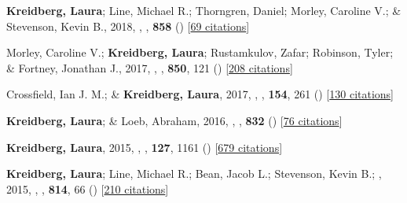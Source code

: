 \item[{\color{numcolor}\scriptsize10}] \textbf{Kreidberg, Laura}; Line, Michael R.; Thorngren, Daniel; Morley, Caroline V.; \& Stevenson, Kevin B., 2018, , \apj, \textbf{858} () [\href{https://ui.adsabs.harvard.edu/abs/2018ApJ...858L...6K}{69 citations}]

\item[{\color{numcolor}\scriptsize9}] Morley, Caroline V.; \textbf{Kreidberg, Laura}; Rustamkulov, Zafar; Robinson, Tyler; \& Fortney, Jonathan J., 2017, , \apj, \textbf{850}, 121 () [\href{https://ui.adsabs.harvard.edu/abs/2017ApJ...850..121M}{208 citations}]

\item[{\color{numcolor}\scriptsize8}] Crossfield, Ian J. M.; \& \textbf{Kreidberg, Laura}, 2017, , \aj, \textbf{154}, 261 () [\href{https://ui.adsabs.harvard.edu/abs/2017AJ....154..261C}{130 citations}]

\item[{\color{numcolor}\scriptsize7}] \textbf{Kreidberg, Laura}; \& Loeb, Abraham, 2016, , \apj, \textbf{832} () [\href{https://ui.adsabs.harvard.edu/abs/2016ApJ...832L..12K}{76 citations}]

\item[{\color{numcolor}\scriptsize6}] \textbf{Kreidberg, Laura}, 2015, , \pasp, \textbf{127}, 1161 () [\href{https://ui.adsabs.harvard.edu/abs/2015PASP..127.1161K}{679 citations}]

\item[{\color{numcolor}\scriptsize5}] \textbf{Kreidberg, Laura}; Line, Michael R.; Bean, Jacob L.; Stevenson, Kevin B.; \etal, 2015, , \apj, \textbf{814}, 66 () [\href{https://ui.adsabs.harvard.edu/abs/2015ApJ...814...66K}{210 citations}]

